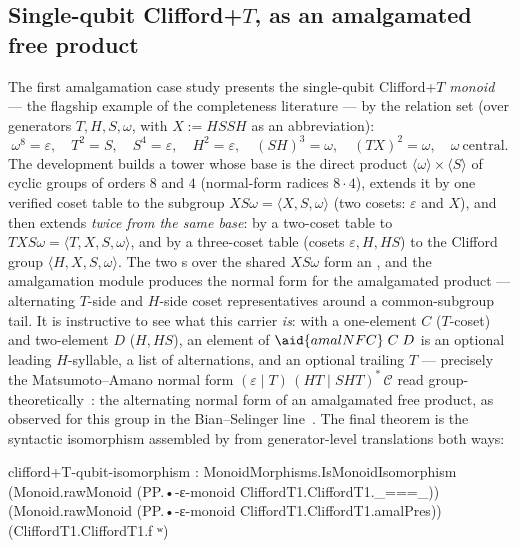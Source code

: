 \subsection{Single-qubit Clifford+$T$, as an amalgamated free product}\label{sec:cliffordt1}

The first amalgamation case study presents the single-qubit Clifford+$T$
\emph{monoid} --- the flagship example of the completeness literature
--- by the relation set (over generators $T, H, S, \omega$, with
$X := H S S H$ as an abbreviation):
\[
  \omega^8 = \varepsilon,\quad
  T^2 = S,\quad
  S^4 = \varepsilon,\quad
  H^2 = \varepsilon,\quad
  (SH)^3 = \omega,\quad
  (TX)^2 = \omega,\quad
  \omega\ \text{central}.
\]
The development builds a tower whose base is the direct product
$\langle \omega \rangle \times \langle S \rangle$ of cyclic groups of
orders $8$ and $4$ (normal-form radices $8 \cdot 4$), extends it by one
verified coset table to the subgroup
$\mathit{XS\omega} = \langle X, S, \omega \rangle$ (two cosets:
$\varepsilon$ and $X$), and then extends \emph{twice from the same base}:
by a two-coset table to
$\mathit{TXS\omega} = \langle T, X, S, \omega \rangle$, and by a
three-coset table (cosets $\varepsilon, H, HS$) to the Clifford group
$\langle H, X, S, \omega \rangle$.  The two s over
the shared $\mathit{XS\omega}$ form an , and the
amalgamation module produces the normal form for the amalgamated product
--- alternating $T$-side and $H$-side coset representatives around a
common-subgroup tail.  It is instructive to see what this carrier
\emph{is}: with a one-element $C$ ($T$-coset) and two-element $D$
($H, HS$), an element of $\aid{amalNFC}\;C\;D$ is an optional leading
$H$-syllable, a list of alternations, and an optional trailing $T$ ---
precisely the Matsumoto--Amano normal form
$(\varepsilon \mid T)\,(HT \mid SHT)^{*}\,\mathcal{C}$ read
group-theoretically~\cite{matsumoto2008representation,giles2013remarks}:
the alternating normal form of an amalgamated free product, as observed
for this group in the Bian--Selinger
line~\cite{bian2023cliffordt2,bian2023thesis}. The final theorem is the
syntactic isomorphism assembled by  from
generator-level translations both ways:

\begin{agdacode}
clifford+T-qubit-isomorphism :
  MonoidMorphisms.IsMonoidIsomorphism
    (Monoid.rawMonoid (PP.•-ε-monoid CliffordT1.CliffordT1._===_))
    (Monoid.rawMonoid (PP.•-ε-monoid CliffordT1.CliffordT1.amalPres))
    (CliffordT1.CliffordT1.f ʷ)
\end{agdacode}


